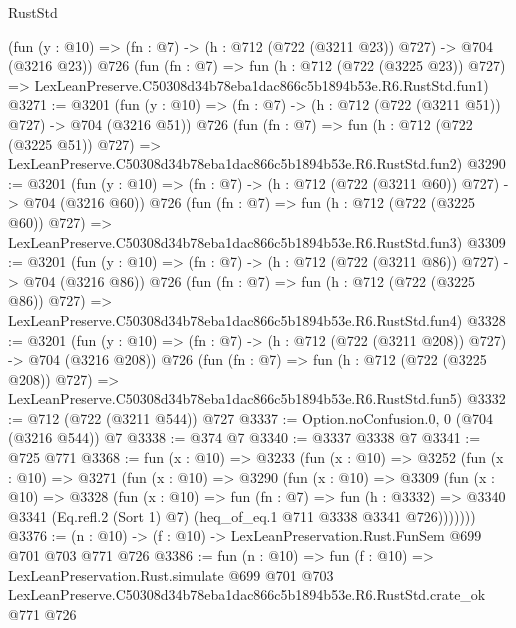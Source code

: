\begin{lexlean}{RustStd}
\begin{coremodule}
    (fun (y : @10) => (fn : @7) -> (h : @712 (@722 (@3211 @23)) @727) -> @704 (@3216 @23))
    @726
    (fun (fn : @7) =>
    fun (h : @712 (@722 (@3225 @23)) @727) =>
    LexLeanPreserve.C50308d34b78eba1dac866c5b1894b53e.R6.RustStd.fun1)
@3271 := @3201
    (fun (y : @10) => (fn : @7) -> (h : @712 (@722 (@3211 @51)) @727) -> @704 (@3216 @51))
    @726
    (fun (fn : @7) =>
    fun (h : @712 (@722 (@3225 @51)) @727) =>
    LexLeanPreserve.C50308d34b78eba1dac866c5b1894b53e.R6.RustStd.fun2)
@3290 := @3201
    (fun (y : @10) => (fn : @7) -> (h : @712 (@722 (@3211 @60)) @727) -> @704 (@3216 @60))
    @726
    (fun (fn : @7) =>
    fun (h : @712 (@722 (@3225 @60)) @727) =>
    LexLeanPreserve.C50308d34b78eba1dac866c5b1894b53e.R6.RustStd.fun3)
@3309 := @3201
    (fun (y : @10) => (fn : @7) -> (h : @712 (@722 (@3211 @86)) @727) -> @704 (@3216 @86))
    @726
    (fun (fn : @7) =>
    fun (h : @712 (@722 (@3225 @86)) @727) =>
    LexLeanPreserve.C50308d34b78eba1dac866c5b1894b53e.R6.RustStd.fun4)
@3328 := @3201
    (fun (y : @10) => (fn : @7) -> (h : @712 (@722 (@3211 @208)) @727) -> @704 (@3216 @208))
    @726
    (fun (fn : @7) =>
    fun (h : @712 (@722 (@3225 @208)) @727) =>
    LexLeanPreserve.C50308d34b78eba1dac866c5b1894b53e.R6.RustStd.fun5)
@3332 := @712 (@722 (@3211 @544)) @727
@3337 := Option.noConfusion.{0, 0} (@704 (@3216 @544)) @7
@3338 := @374 @7
@3340 := @3337 @3338 @7
@3341 := @725 @771
@3368 := fun (x : @10) =>
  @3233
    (fun (x : @10) =>
    @3252
      (fun (x : @10) =>
      @3271
        (fun (x : @10) =>
        @3290
          (fun (x : @10) =>
          @3309
            (fun (x : @10) =>
            @3328
              (fun (x : @10) =>
              fun (fn : @7) =>
              fun (h : @3332) =>
              @3340 @3341 (Eq.refl.{2} (Sort 1) @7) (heq_of_eq.{1} @711 @3338 @3341 @726)))))))
@3376 := (n : @10) -> (f : @10) -> LexLeanPreservation.Rust.FunSem @699 @701 @703 @771 @726
@3386 := fun (n : @10) =>
  fun (f : @10) =>
  LexLeanPreservation.Rust.simulate
    @699
    @701
    @703
    LexLeanPreserve.C50308d34b78eba1dac866c5b1894b53e.R6.RustStd.crate_ok
    @771
    @726
\end{coremodule}
\end{lexlean}
